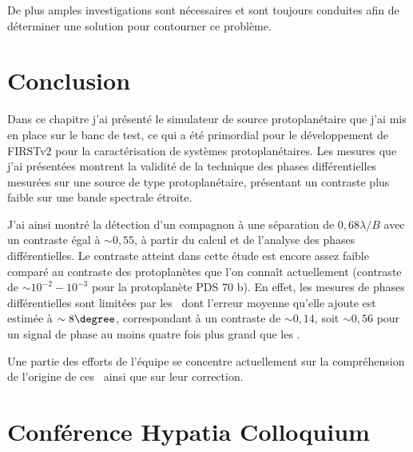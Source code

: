 De plus amples investigations sont nécessaires et sont toujours conduites afin de déterminer une solution pour contourner ce problème.


\section{Conclusion}

Dans ce chapitre j'ai présenté le simulateur de source protoplanétaire que j'ai mis en place sur le banc de test, ce qui a été primordial pour le développement de \ac{FIRSTv2} pour la caractérisation de systèmes protoplanétaires. Les mesures que j'ai présentées montrent la validité de la technique des phases différentielles mesurées sur une source de type protoplanétaire, présentant un contraste plus faible sur une bande spectrale étroite.

J'ai ainsi montré la détection d'un compagnon à une séparation de $0,68 \lambda / B$ avec un contraste égal à $\sim 0,55$, à partir du calcul et de l'analyse des phases différentielles. Le contraste atteint dans cette étude est encore assez faible comparé au contraste des protoplanètes que l'on connaît actuellement (contraste de $\sim 10^{-2} - 10^{-3}$ pour la protoplanète PDS 70 b). En effet, les mesures de phases différentielles sont limitées par les \wiggles~dont l'erreur moyenne qu'elle ajoute est estimée à $\sim 8\degree$, correspondant à un contraste de $\sim 0,14$, soit $\sim 0,56$ pour un signal de phase au moins quatre fois plus grand que les \wiggles.

Une partie des efforts de l'équipe se concentre actuellement sur la compréhension de l'origine de ces \wiggles~ainsi que sur leur correction.


\clearpage
\section*{Conférence Hypatia Colloquium}
\label{sec:HypatiaProceeding}
{}

\clearpage



